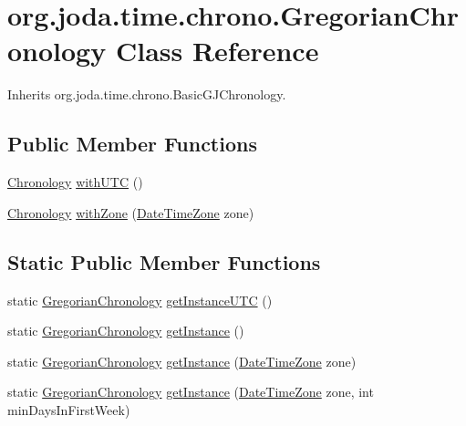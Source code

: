 \hypertarget{classorg_1_1joda_1_1time_1_1chrono_1_1_gregorian_chronology}{\section{org.\-joda.\-time.\-chrono.\-Gregorian\-Chronology Class Reference}
\label{classorg_1_1joda_1_1time_1_1chrono_1_1_gregorian_chronology}
}


Inherits org.\-joda.\-time.\-chrono.\-Basic\-G\-J\-Chronology.

\subsection*{Public Member Functions}
\begin{DoxyCompactItemize}
\item 
\hyperlink{classorg_1_1joda_1_1time_1_1_chronology}{Chronology} \hyperlink{classorg_1_1joda_1_1time_1_1chrono_1_1_gregorian_chronology_a2efd6649353e4b99d85b4c091dcf3915}{with\-U\-T\-C} ()
\item 
\hyperlink{classorg_1_1joda_1_1time_1_1_chronology}{Chronology} \hyperlink{classorg_1_1joda_1_1time_1_1chrono_1_1_gregorian_chronology_a27c4655f880e7ee0076fe3a76500bdf3}{with\-Zone} (\hyperlink{classorg_1_1joda_1_1time_1_1_date_time_zone}{Date\-Time\-Zone} zone)
\end{DoxyCompactItemize}
\subsection*{Static Public Member Functions}
\begin{DoxyCompactItemize}
\item 
static \hyperlink{classorg_1_1joda_1_1time_1_1chrono_1_1_gregorian_chronology}{Gregorian\-Chronology} \hyperlink{classorg_1_1joda_1_1time_1_1chrono_1_1_gregorian_chronology_a9d9ec388de82889ebd6cabeb99f6ae62}{get\-Instance\-U\-T\-C} ()
\item 
static \hyperlink{classorg_1_1joda_1_1time_1_1chrono_1_1_gregorian_chronology}{Gregorian\-Chronology} \hyperlink{classorg_1_1joda_1_1time_1_1chrono_1_1_gregorian_chronology_a55a8d443f693480116ee97c51ca93829}{get\-Instance} ()
\item 
static \hyperlink{classorg_1_1joda_1_1time_1_1chrono_1_1_gregorian_chronology}{Gregorian\-Chronology} \hyperlink{classorg_1_1joda_1_1time_1_1chrono_1_1_gregorian_chronology_a612b71106a75432b61f4661b9d262b57}{get\-Instance} (\hyperlink{classorg_1_1joda_1_1time_1_1_date_time_zone}{Date\-Time\-Zone} zone)
\item 
static \hyperlink{classorg_1_1joda_1_1time_1_1chrono_1_1_gregorian_chronology}{Gregorian\-Chronology} \hyperlink{classorg_1_1joda_1_1time_1_1chrono_1_1_gregorian_chronology_a2dd84fcc2762f1201ab606a09400b191}{get\-Instance} (\hyperlink{classorg_1_1joda_1_1time_1_1_date_time_zone}{Date\-Time\-Zone} zone, int min\-Days\-In\-First\-Week)
\end{DoxyCompactItemize}
